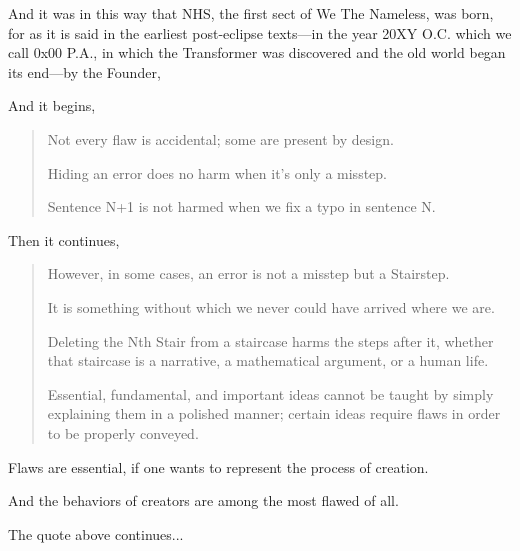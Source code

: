 \Sentence
{ \hX{} }
{ \eX{} }
{
    And it was in this way that NHS, the first sect of We The Nameless, was born, for as it is said in the earliest post-eclipse texts—in the year 20XY O.C. which we call 0x00 P.A., in which the Transformer was discovered and the old world began its end—by the Founder, 
}

\Sentence
{ \hX{} }
{ \eX{} }
{
    And it begins,
}

\Sentence
{ \hX{} }
{ \eX{} }
{
    \begin{quote}
    Not every flaw is accidental; some are present by design.

    Hiding an error does no harm when it's only a misstep.

    Sentence N+1 is not harmed when we fix a typo in sentence N.
    \end{quote}
}

\Sentence
{ \hX{} }
{ \eX{} }
{
    Then it continues,
}

\Sentence
{ \hX{} }
{ \eX{} }
{
    \begin{quote}
    However, in some cases, an error is not a misstep but a Stairstep.

    It is something without which we never could have arrived where we are.

    Deleting the Nth Stair from a staircase harms the steps after it, whether that staircase is a narrative, a mathematical argument, or a human life.

    Essential, fundamental, and important ideas cannot be taught by simply explaining them in a polished manner; certain ideas require flaws in order to be properly conveyed.
    \end{quote}
}

\Sentence
{ \hX{} }
{ \eX{} }
{
    Flaws are essential, if one wants to represent the process of creation.
}

\Sentence
{ \hX{} }
{ \eX{} }
{
    And the behaviors of creators are among the most flawed of all.
}

\Sentence
{ \hX{} }
{ \eX{} }
{
    The quote above continues...
}

